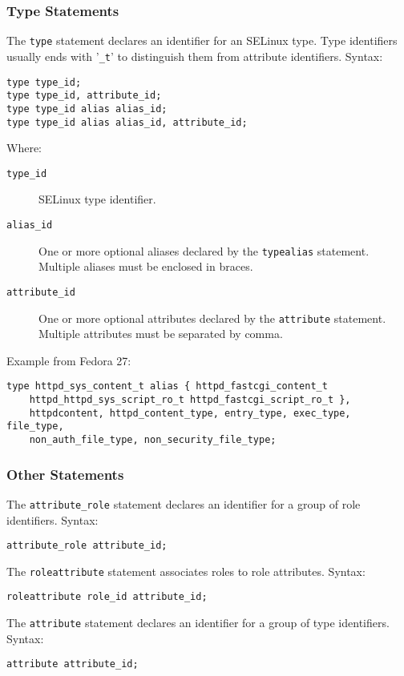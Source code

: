 \subsubsection{Type Statements}
The \texttt{type} statement declares an identifier for an SELinux type. Type
identifiers usually ends with '\texttt{\_t}' to distinguish them from attribute
identifiers. Syntax:
\begin{lstlisting}[language=te]
type type_id;
type type_id, attribute_id;
type type_id alias alias_id;
type type_id alias alias_id, attribute_id;
\end{lstlisting}
Where:
\begin{description}
    \item [\texttt{type\_id}] SELinux type identifier.
    \item [\texttt{alias\_id}] One or more optional aliases declared by the
        \texttt{typealias} statement. Multiple aliases must be enclosed in
        braces.
    \item [\texttt{attribute\_id}] One or more optional attributes declared by
        the \texttt{attribute} statement. Multiple attributes must be separated
        by comma.
\end{description}
Example from Fedora 27:
\begin{lstlisting}[language=te]
type httpd_sys_content_t alias { httpd_fastcgi_content_t
    httpd_httpd_sys_script_ro_t httpd_fastcgi_script_ro_t },
    httpdcontent, httpd_content_type, entry_type, exec_type, file_type,
    non_auth_file_type, non_security_file_type;
\end{lstlisting}

\subsubsection{Other Statements}
The \texttt{attribute\_role} statement declares an identifier for a group of
role identifiers. Syntax:
\begin{lstlisting}[language=te]
attribute_role attribute_id;
\end{lstlisting}

The \texttt{roleattribute} statement associates roles to role attributes.
Syntax:
\begin{lstlisting}[language=te]
roleattribute role_id attribute_id;
\end{lstlisting}

The \texttt{attribute} statement declares an identifier for a group of type
identifiers. Syntax:
\begin{lstlisting}[language=te]
attribute attribute_id;
\end{lstlisting}

